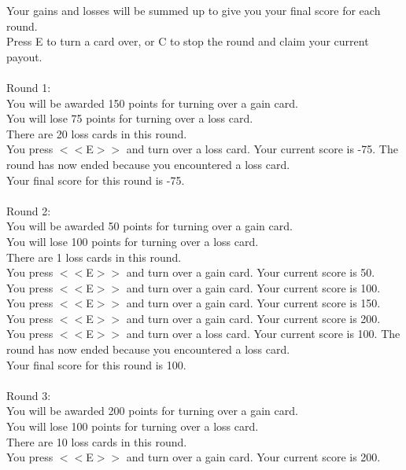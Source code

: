 \documentclass[pdflatex,sn-nature]{sn-jnl}%
\theoremstyle{thmstyleone}%
\theoremstyle{thmstyletwo}%
\theoremstyle{thmstylethree}%
\begin{document}
Your gains and losses will be summed up to give you your final score for each round. $~$\\ 
Press E to turn a card over, or C to stop the round and claim your current payout. $~$\\ 
 $~$\\ 
Round 1: $~$\\ 
You will be awarded 150 points for turning over a gain card. $~$\\ 
You will lose 75 points for turning over a loss card. $~$\\ 
There are 20 loss cards in this round. $~$\\ 
You press $<<$E$>>$ and turn over a loss card. Your current score is -75. The round has now ended because you encountered a loss card. $~$\\ 
Your final score for this round is -75. $~$\\ 
 $~$\\ 
Round 2: $~$\\ 
You will be awarded 50 points for turning over a gain card. $~$\\ 
You will lose 100 points for turning over a loss card. $~$\\ 
There are 1 loss cards in this round. $~$\\ 
You press $<<$E$>>$ and turn over a gain card. Your current score is 50. $~$\\ 
You press $<<$E$>>$ and turn over a gain card. Your current score is 100. $~$\\ 
You press $<<$E$>>$ and turn over a gain card. Your current score is 150. $~$\\ 
You press $<<$E$>>$ and turn over a gain card. Your current score is 200. $~$\\ 
You press $<<$E$>>$ and turn over a loss card. Your current score is 100. The round has now ended because you encountered a loss card. $~$\\ 
Your final score for this round is 100. $~$\\ 
 $~$\\ 
Round 3: $~$\\ 
You will be awarded 200 points for turning over a gain card. $~$\\ 
You will lose 100 points for turning over a loss card. $~$\\ 
There are 10 loss cards in this round. $~$\\ 
You press $<<$E$>>$ and turn over a gain card. Your current score is 200. $~$\\ 
\end{document}
